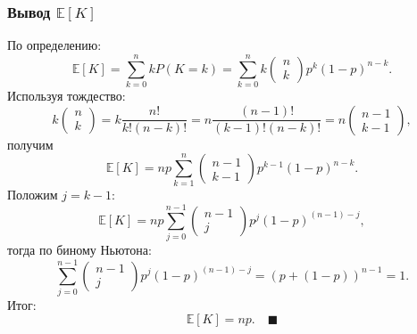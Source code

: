 \documentclass[
  russian,
  12pt,
  a4paper,
  a4paper,
  openany]{scrbook}
\begin{document}
\begin{bookderivation}

\subsubsection{\texorpdfstring{\textbf{Вывод}
\(\mathbb{E}[K]\)}{Вывод \textbackslash mathbb\{E\}{[}K{]}}}\label{ux432ux44bux432ux43eux434-mathbbek}

По определению:
\[\mathbb{E}[K]=\sum_{k=0}^n kP(K=k)=\sum_{k=0}^n k \begin{pmatrix} n\\k\end{pmatrix} p^k(1-p)^{n-k}.\]
Используя тождество:
\[k \begin{pmatrix} n\\k\end{pmatrix}=k\frac{n!}{k!(n-k)!}=n\frac{(n-1)!}{(k-1)!(n-k)!}=n\begin{pmatrix} n-1\\k-1\end{pmatrix},\]
получим
\[\mathbb{E}[K]=np\sum_{k=1}^n \begin{pmatrix} n-1\\k-1\end{pmatrix}p^{k-1}(1-p)^{n-k}.\]
Положим \(j=k-1\):
\[\mathbb{E}[K]=np\sum_{j=0}^{n-1} \begin{pmatrix} n-1\\j\end{pmatrix}p^{j}(1-p)^{(n-1)-j},\]
тогда по биному Ньютона:
\[\sum_{j=0}^{n-1} \begin{pmatrix} n-1\\j\end{pmatrix}p^{j}(1-p)^{(n-1)-j}=(p+(1-p))^{n-1}=1.\]
Итог: \[\mathbb{E}[K]=np. \quad \blacksquare\]

\end{bookderivation}
\end{document}
